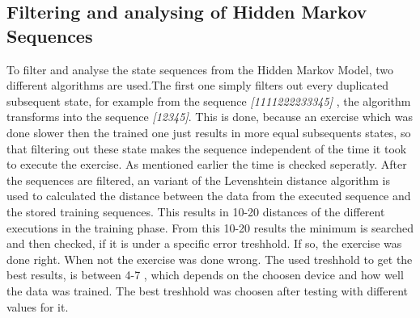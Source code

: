 \subsection{Filtering and analysing of Hidden Markov Sequences}

To filter and analyse the state sequences from the Hidden Markov Model, two different algorithms are used.The first one simply filters out every duplicated subsequent state, for example from the sequence \textit{\small[1111222233345]} , the algorithm transforms into the sequence \textit{\small[12345]}. This is done, because an exercise which was done slower then the trained one just results in more equal subsequents states, so that filtering out these state makes the sequence independent of the time it took to execute the exercise. As mentioned earlier the time is checked seperatly. %
\newline
\newline
After the sequences are filtered, an variant of the Levenshtein distance algorithm is used to calculated the distance between the data from the executed sequence and the stored training sequences. This results in 10-20 distances of the different executions in the training phase. From this 10-20 results the minimum is searched and then checked, if it is under a specific error treshhold. If so, the exercise was done right. When not the exercise was done wrong. The used treshhold to get the best results, is between 4-7 , which depends on the choosen device and how well the data was trained. The best treshhold was choosen after testing with different values for it.
